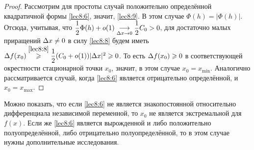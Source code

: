 \documentclass[../../main.tex]{subfiles}
\begin{document}
\begin{proof}
        Рассмотрим для простоты случай положительно определённой квадратичной
        формы \eqref{lec8:6}, значит, \eqref{lec8:9}. В этом случае $\Phi(h) =
        |\Phi(h)|$. Отсюда, учитывая, что $\dfrac12 \Phi(h) + o(1) \underset{\Delta
        x \to 0}{\longrightarrow} \dfrac12C_0 > 0$, для достаточно малых
        приращений $\Delta x \ne 0$ в силу \eqref{lec8:8} будем иметь $\Delta f(x_0)
        \stackrel{\eqref{lec8:8}}{\geqslant} \dfrac12 (C_0 + o(1)) |\Delta x|^2 \geqslant 0$.
        То есть $\Delta f(x_0) \geqslant 0$ в соответствующей окрестности стационарной
        точки $x_0$, значит, в этом случае $x_0 = x_{\min}$. Аналогично
        рассматривается случай, когда \eqref{lec8:6} является отрицательно
        определённой, и $x_0 = x_{\max}$.
    \end{proof}
    \begin{rem}
        Можно показать, что если \eqref{lec8:6} не является знакопостоянной
        относительно дифференциала независимой переменной, то $x_0$ не
        является экстремальной для $f(x)$. Если же \eqref{lec8:6} является
        вырожденной и либо положительно полуопределённой, либо отрицательно
        полуопределённой, то в этом случае нужны дополнительные исследования.
    \end{rem}
    
\end{document}
